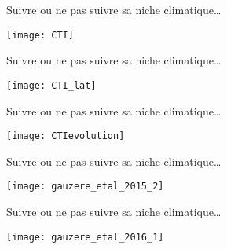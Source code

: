 \documentclass[10pt]{beamer}
\begin{document}
\begin{frame}{Suivre ou ne pas suivre sa niche climatique…}
 \begin{center}
   \texttt{[image: CTI]}
 \end{center}

 \begin{tiny}
    \cite{Devictor2008}
  \end{tiny}
\end{frame}

\begin{frame}{Suivre ou ne pas suivre sa niche climatique…}
  \begin{center}
   \texttt{[image: CTI\_lat]}
  \end{center}

  \begin{tiny}
   \cite{Devictor2008}
  \end{tiny}
\end{frame}

\begin{frame}{Suivre ou ne pas suivre sa niche climatique…}
  \begin{center}
   \texttt{[image: CTIevolution]}
  \end{center}

  \begin{tiny}
    \cite{Devictor2008}
  \end{tiny}
\end{frame}



\begin{frame}{Suivre ou ne pas suivre sa niche climatique…}
  \begin{center}
         \texttt{[image: gauzere\_etal\_2015\_2]}
  \end{center}

  \begin{tiny}
    \cite{Gauzere2015}
  \end{tiny}
\end{frame}

\begin{frame}{Suivre ou ne pas suivre sa niche climatique…}
  \begin{center}
   \texttt{[image: gauzere\_etal\_2016\_1]}

  \end{center}

  \begin{tiny}
   \cite{Gauzere2016}
  \end{tiny}
\end{frame}
\end{document}
